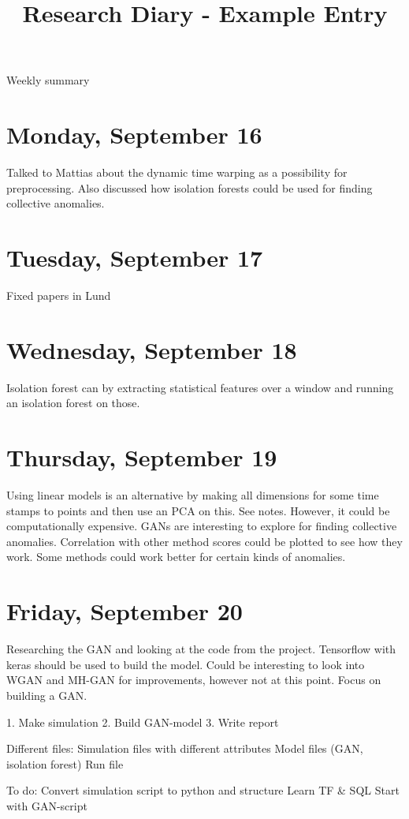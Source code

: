 \documentclass[11pt,letterpaper]{article}
\begin{document}
\univlogo

\title{Research Diary - Example Entry}

{\Huge Weekly summary}\\[5mm]

\section*{Monday, September 16}
Talked to Mattias about the dynamic time warping as a possibility for preprocessing.
Also discussed how isolation forests could be used for finding collective anomalies.

\section*{Tuesday, September 17}
Fixed papers in Lund

\section*{Wednesday, September 18}
Isolation forest can by extracting statistical features over a window and running an isolation forest on those. 

\section*{Thursday, September 19}
Using linear models is an alternative by making all dimensions for some time stamps to points and then use an PCA on this. See notes. However, it could be computationally expensive. GANs are interesting to explore for finding collective anomalies. Correlation with other method scores could be plotted to see how they work. Some methods could work better for certain kinds of anomalies. 

\section*{Friday, September 20}
Researching the GAN and looking at the code from the project. Tensorflow with keras should be used to build the model. Could be interesting to look into WGAN and MH-GAN for improvements, however not at this point. Focus on building a GAN.

1. Make simulation
2. Build GAN-model
3. Write report

Different files:
Simulation files with different attributes
Model files (GAN, isolation forest)
Run file

To do:
Convert simulation script to python and structure
Learn TF & SQL
Start with GAN-script


\printbibliography
\end{document}
